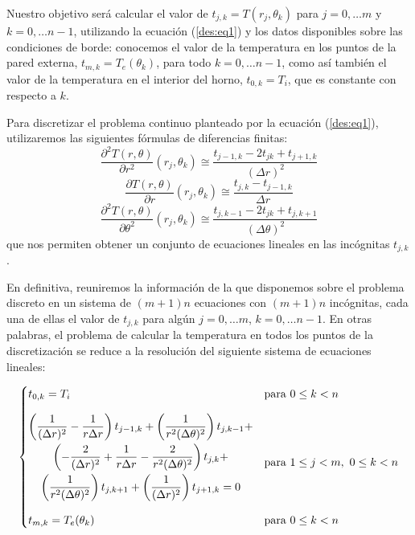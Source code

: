 \documentclass[11pt, a4paper, spanish]{article}
\theoremstyle{plain}
\theoremstyle{remark}
\begin{document}
    Nuestro objetivo será calcular el valor de $t_{j,k} = T(r_j, \theta_k)$ para $j = 0, \dots m$ y $k = 0, \dots n-1$, utilizando la ecuación (\ref{des:eq1}) y los datos disponibles sobre las condiciones de borde: conocemos el valor de la temperatura en los puntos de la pared externa, $t_{m,k} = T_e(\theta_k)$, para todo $k = 0, \dots n-1$, como así también el valor de la temperatura en el interior del horno, $t_{0,k} = T_i$, que es constante con respecto a $k$.

    Para discretizar el problema continuo planteado por la ecuación (\ref{des:eq1}), utilizaremos las siguientes fórmulas de diferencias finitas:
    \[ \frac{\partial^2 T(r, \theta)}{\partial r^2}(r_j, \theta_k) \cong \frac{t_{j-1,k} - 2 t_{jk} + t_{j+1,k}}{(\Delta r)^2} \]
    \[ \frac{\partial T(r, \theta)}{\partial r}(r_j, \theta_k) \cong \frac{t_{j,k} - t_{j-1,k}}{\Delta r} \]
    \[ \frac{\partial^2 T(r, \theta)}{\partial \theta^2}(r_j, \theta_k) \cong \frac{t_{j,k-1} - 2 t_{jk} + t_{j,k+1}}{(\Delta \theta)^2} \]
    que nos permiten obtener un conjunto de ecuaciones lineales en las incógnitas $t_{j,k}$.

    En definitiva, reuniremos la información de la que disponemos sobre el problema discreto en un sistema de $(m+1)n$ ecuaciones con $(m+1)n$ incógnitas, cada una de ellas el valor de $t_{j,k}$ para algún $j = 0, \dots m$, $k = 0, \dots n-1$. En otras palabras, el problema de calcular la temperatura en todos los puntos de la discretización se reduce a la resolución del siguiente sistema de ecuaciones lineales:

    \[ \begin{cases}
    \setlength{\jot}{2em}
      t_{0,k} = T_i
        & \text{para } 0 \leq k < n \\[1em]
      \begin{gathered}
        \left( \frac{1}{(\Delta r)^2} - \frac{1}{r \Delta r} \right) t_{j-1,k} +
          \left( \frac{1}{r^2(\Delta \theta)^2} \right) t_{j,k-1} + \\
          \left( - \frac{2}{(\Delta r)^2} + \frac{1}{r \Delta r} - \frac{2}{r^2(\Delta \theta)^2} \right) t_{j,k} + \\
          \left( \frac{1}{r^2(\Delta \theta)^2} \right) t_{j,k+1} +
          \left( \frac{1}{(\Delta r)^2} \right) t_{j+1,k} = 0 \\[1em]
        \end{gathered}
        & \text{para } 1 \leq j < m,\ 0 \leq k < n \\
      t_{m,k} = T_e(\theta_k)
        & \text{para } 0 \leq k < n \\
    \end{cases} \]
\end{document}
